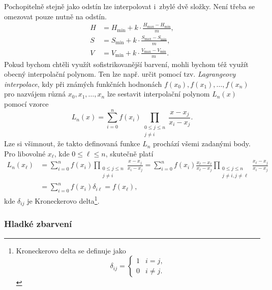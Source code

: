 Pochopitelně stejně jako odstín lze interpolovat i~zbylé dvě složky. Není třeba se omezovat pouze nutně na odstín.
\begin{align*}
    H&=H_{\text{min}}+k\cdot\frac{H_{\text{max}}-H_{\text{min}}}{m},\\
    S&=S_{\text{min}}+k\cdot\frac{S_{\text{max}}-S_{\text{min}}}{m},\\
    V&=V_{\text{min}}+k\cdot\frac{V_{\text{max}}-V_{\text{min}}}{m}.
\end{align*}
Pokud bychom chtěli využít sofistrikovanější barvení, mohli bychom též využít obecný interpolační polynom. Ten lze např. určit pomocí tzv. \emph{Lagrangeovy interpolace}, kdy při známých funkčních hodnonách $f(x_0),f(x_1),\ldots,f(x_n)$ pro nazvájem různá $x_0,x_1,\ldots,x_n$ lze sestavit interpolační polynom $L_n(x)$ pomocí vzorce
\[L_n(x)=\sum_{i=0}^{n}f(x_i)\prod_{\substack{0\leqslant j\leqslant n\\j\neq i}}{\frac {x-x_{j}}{x_{i}-x_{j}}}.\]
Lze si všimnout, že takto definovaná funkce $L_n$ prochází všemi zadanými body. Pro libovolné $x_\ell$, kde $0\leqslant\ell\leqslant n$, skutečně platí
\begin{align*}
    L_n(x_\ell)&=\sum_{i=0}^{n}f(x_i)\prod_{\substack{0\leqslant j\leqslant n\\j\neq i}}{\frac {x-x_{j}}{x_{i}-x_{j}}}=\sum_{i=0}^{n}f(x_i)\frac{x_\ell-x_\ell}{x_{\ell}-x_{j}}\prod_{\substack{0\leqslant j\leqslant n\\j\neq i,j\neq\ell}}{\frac {x_\ell-x_{j}}{x_{i}-x_{j}}}\\
    &=\sum_{i=0}^{n}f(x_i)\delta_{i\ell}=f(x_\ell),
\end{align*}
kde $\delta_{ij}$ je Kroneckerovo delta\footnote{Kroneckerovo delta se definuje jako
\[\delta_{ij}=\begin{cases}
    1 & i=j,\\
    0 & i\neq j.
\end{cases}\]
}.

\subsubsection{Hladké zbarvení}

